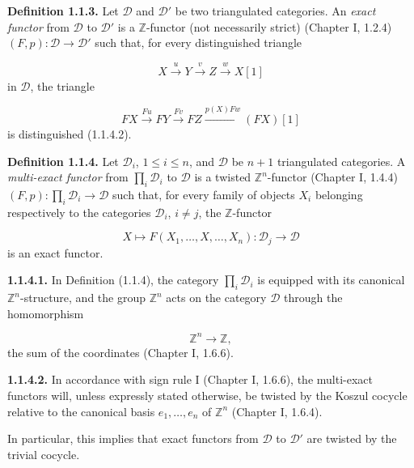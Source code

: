 %
\begingroup
\small
\setlength{\abovedisplayskip}{4pt plus 2pt minus 2pt}%
\setlength{\belowdisplayskip}{4pt plus 2pt minus 2pt}%

\noindent\textbf{Definition 1.1.3.}\quad
Let $\mathcal D$ and $\mathcal D'$ be two triangulated categories. An
\emph{exact functor} from $\mathcal D$ to $\mathcal D'$ is a
$\mathbb Z$-functor (not necessarily strict) (Chapter I, 1.2.4)
$(F,p)\colon\mathcal D\longrightarrow\mathcal D'$ such that, for every
distinguished triangle

\[
  X\xrightarrow{u}Y\xrightarrow{v}Z\xrightarrow{w}X[1]
\]
in $\mathcal D$, the triangle

\[
  FX\xrightarrow{Fu}FY\xrightarrow{Fv}FZ
  \xrightarrow{p(X)Fw}(FX)[1]
\]
is distinguished (1.1.4.2).

\medskip
\noindent\textbf{Definition 1.1.4.}\quad
Let $\mathcal D_i$, $1\leq i\leq n$, and $\mathcal D$ be $n+1$
triangulated categories. A \emph{multi-exact functor} from
$\prod_i\mathcal D_i$ to $\mathcal D$ is a twisted $\mathbb Z^n$-functor
(Chapter I, 1.4.4)
$(F,p)\colon\prod_i\mathcal D_i\longrightarrow\mathcal D$ such that, for
every family of objects $X_i$ belonging respectively to the categories
$\mathcal D_i$, $i\ne j$, the $\mathbb Z$-functor

\[
  X\longmapsto F(X_1,\ldots,X,\ldots,X_n)\colon
  \mathcal D_j\longrightarrow\mathcal D
\]
is an exact functor.

\medskip
\noindent\textbf{1.1.4.1.}\quad
In Definition (1.1.4), the category $\prod_i\mathcal D_i$ is equipped
with its canonical $\mathbb Z^n$-structure, and the group $\mathbb Z^n$
acts on the category $\mathcal D$ through the homomorphism

\[
  \mathbb Z^n\longrightarrow\mathbb Z,
\]
the sum of the coordinates (Chapter I, 1.6.6).

\medskip
\noindent\textbf{1.1.4.2.}\quad
In accordance with sign rule I (Chapter I, 1.6.6), the multi-exact
functors will, unless expressly stated otherwise, be twisted by the
Koszul cocycle relative to the canonical basis $e_1,\ldots,e_n$ of
$\mathbb Z^n$ (Chapter I, 1.6.4).

In particular, this implies that exact functors from $\mathcal D$ to
$\mathcal D'$ are twisted by the trivial cocycle.

